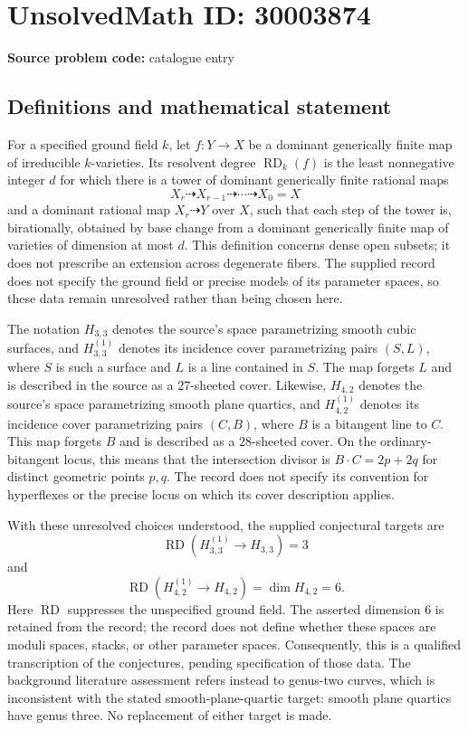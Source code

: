 \documentclass[11pt]{article}
\begin{document}
\section*{UnsolvedMath ID: 30003874}
\textbf{Source problem code:} catalogue entry
\subsection{Definitions and mathematical statement}
For a specified ground field \(k\), let \(f:Y\to X\) be a dominant generically finite map of irreducible \(k\)-varieties. Its resolvent degree \(\operatorname{RD}_k(f)\) is the least nonnegative integer \(d\) for which there is a tower of dominant generically finite rational maps
\[
X_r\dashrightarrow X_{r-1}\dashrightarrow\cdots\dashrightarrow X_0=X
\]
and a dominant rational map \(X_r\dashrightarrow Y\) over \(X\), such that each step of the tower is, birationally, obtained by base change from a dominant generically finite map of varieties of dimension at most \(d\). This definition concerns dense open subsets; it does not prescribe an extension across degenerate fibers. The supplied record does not specify the ground field or precise models of its parameter spaces, so these data remain unresolved rather than being chosen here.

The notation \(H_{3,3}\) denotes the source's space parametrizing smooth cubic surfaces, and \(H_{3,3}^{(1)}\) denotes its incidence cover parametrizing pairs \((S,L)\), where \(S\) is such a surface and \(L\) is a line contained in \(S\). The map forgets \(L\) and is described in the source as a \(27\)-sheeted cover. Likewise, \(H_{4,2}\) denotes the source's space parametrizing smooth plane quartics, and \(H_{4,2}^{(1)}\) denotes its incidence cover parametrizing pairs \((C,B)\), where \(B\) is a bitangent line to \(C\). This map forgets \(B\) and is described as a \(28\)-sheeted cover. On the ordinary-bitangent locus, this means that the intersection divisor is \(B\cdot C=2p+2q\) for distinct geometric points \(p,q\). The record does not specify its convention for hyperflexes or the precise locus on which its cover description applies.

With these unresolved choices understood, the supplied conjectural targets are
\[
\operatorname{RD}\!\left(H_{3,3}^{(1)}\longrightarrow H_{3,3}\right)=3
\]
and
\[
\operatorname{RD}\!\left(H_{4,2}^{(1)}\longrightarrow H_{4,2}\right)
=\dim H_{4,2}=6.
\]
Here \(\operatorname{RD}\) suppresses the unspecified ground field. The asserted dimension \(6\) is retained from the record; the record does not define whether these spaces are moduli spaces, stacks, or other parameter spaces. Consequently, this is a qualified transcription of the conjectures, pending specification of those data. The background literature assessment refers instead to genus-two curves, which is inconsistent with the stated smooth-plane-quartic target: smooth plane quartics have genus three. No replacement of either target is made.
\end{document}
